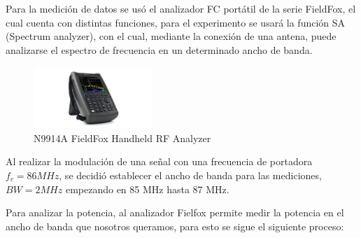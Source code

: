 \documentclass[conference]{IEEEtran}
\begin{document}
	Para la medición de datos se usó el analizador FC portátil de la serie FieldFox, el cual cuenta con distintas funciones, para el experimento se usará la función SA (Spectrum analyzer), con el cual, mediante la conexión de una antena, puede analizarse el espectro de frecuencia en un determinado ancho de banda.
	
	\begin{figure}[h]
		\centering
		\includegraphics[width=0.4\textwidth]{media/Analyzer.png}
		\caption{N9914A FieldFox Handheld RF Analyzer}
		\label{fig:Analyzer}
	\end{figure}
	
	
	Al realizar la modulación de una señal con una frecuencia de portadora $f_c=86 MHz$, se decidió establecer el ancho de banda para las mediciones, $BW=2MHz$ empezando en 85 MHz hasta 87 MHz.
	
	Para analizar la potencia, al analizador Fielfox permite medir la potencia en el ancho de banda que nosotros queramos, para esto se sigue el siguiente proceso:
	
\end{document}
